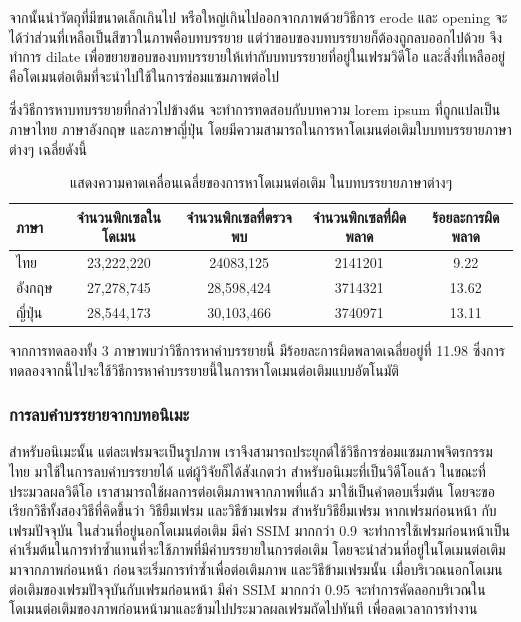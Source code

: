 \documentclass[hidelinks, a4paper,12pt]{article}
\numberwithin{equation}{section}							%
\numberwithin{equation}{section}
\begin{document}
{	\hspace{1cm} จากนั้นนำวัตถุที่มีขนาดเล็กเกินไป หรือใหญ่เกินไปออกจากภาพด้วยวิธีการ erode และ opening
	จะได้ว่าส่วนที่เหลือเป็นสีขาวในภาพคือบทบรรยาย แต่ว่าขอบของบทบรรยายก็ต้องถูกลบออกไปด้วย จึงทำการ dilate เพื่อขยายขอบของบทบรรยายให้เท่ากับบทบรรยายที่อยู่ในเฟรมวิดีโอ และสิ่งที่เหลืออยู่คือโดเมนต่อเติมที่จะนำไปใช้ในการซ่อมแซมภาพต่อไป
	
	\hspace{1cm} ซึ่งวิธีการหาบทบรรยายที่กล่าวไปข้างต้น จะทำการทดสอบกับบทความ lorem ipsum ที่ถูกแปลเป็นภาษาไทย ภาษาอังกฤษ และภาษาญี่ปุ่น โดยมีความสามารถในการหาโดเมนต่อเติมใบบทบรรยายภาษาต่างๆ  เฉลี่ยดังนี้
	\begin{table}[H]
		\centering
		\begin{tabular}[ht]{|l|c|c|c|c|}
			\hline
			ภาษา  & จำนวนพิกเซลในโดเมน & จำนวนพิกเซลที่ตรวจพบ & จำนวนพิกเซลที่ผิดพลาด & ร้อยละการผิดพลาด \\
			\hline
			ไทย & 23,222,220 & 24083,125 & 2141201 & 9.22 \\
			อังกฤษ & 27,278,745 & 28,598,424 & 3714321 & 13.62 \\
			ญี่ปุ่น & 28,544,173 & 30,103,466 & 3740971 & 13.11 \\
			\hline
		\end{tabular}
		\caption{แสดงความคาดเคลื่อนเฉลี่ยของการหาโดเมนต่อเติม ในบทบรรยายภาษาต่างๆ}
	\end{table}	
	
	\hspace{1cm} จากการทดลองทั้ง  3 ภาษาพบว่าวิธีการหาคำบรรยายนี้ มีร้อยละการผิดพลาดเฉลี่ยอยู่ที่ 11.98 ซึ่งการทดลองจากนี้ไปจะใช้วิธีการหาคำบรรยายนี้ในการหาโดเมนต่อเติมแบบอัตโนมัติ
	
	\subsubsection{การลบคำบรรยายจากบทอนิเมะ}
	\hspace{1cm} สำหรับอนิเมะนั้น แต่ละเฟรมจะเป็นรูปภาพ เราจึงสามารถประยุกต์ใช้วิธีการซ่อมแซมภาพจิตรกรรมไทย มาใช้ในการลบคำบรรยายได้ แต่ผู้วิจัยก็ได้สังเกตว่า สำหรับอนิเมะที่เป็นวิดีโอแล้ว ในขณะที่ประมวลผลวิดีโอ เราสามารถใช้ผลการต่อเติมภาพจากภาพที่แล้ว มาใช้เป็นคำตอบเริ่มต้น โดยจะขอเรียกวิธีทั้งสองวิธีที่คิดขึ้นว่า วิธียืมเฟรม และวิธีข้ามเฟรม สำหรับวิธียืมเฟรม หากเฟรมก่อนหน้า กับเฟรมปัจจุบัน ในส่วนที่อยู่นอกโดเมนต่อเติม มีค่า SSIM มากกว่า 0.9 จะทำการใช้เฟรมก่อนหน้าเป็นค่าเริ่มต้นในการทำซ้ำแทนที่จะใช้ภาพที่มีคำบรรยายในการต่อเติม โดยจะนำส่วนที่อยู่ในโดเมนต่อเติมมาจากภาพก่อนหน้า ก่อนจะเริ่มการทำซ้ำเพื่อต่อเติมภาพ และวิธีข้ามเฟรมนั้น เมื่อบริเวณนอกโดเมนต่อเติมของเฟรมปัจจุบันกับเฟรมก่อนหน้า มีค่า SSIM มากกว่า 0.95 จะทำการคัดลอกบริเวณในโดเมนต่อเติมของภาพก่อนหน้ามาและข้ามไปประมวลผลเฟรมถัดไปทันที เพื่อลดเวลาการทำงาน 
	
}
\end{document}
